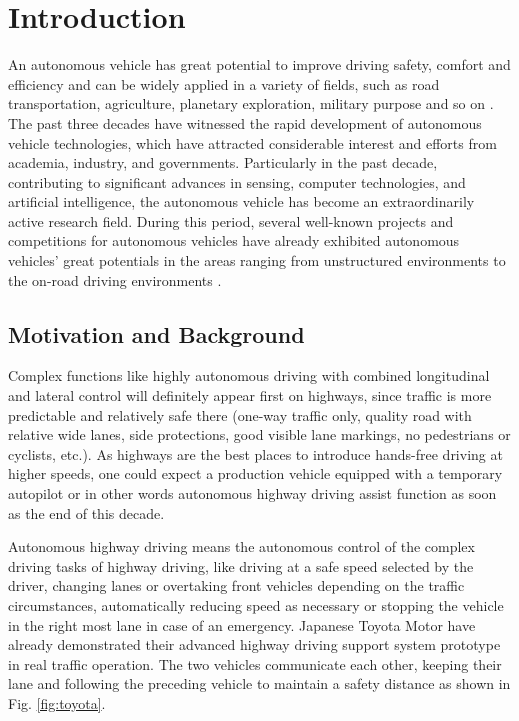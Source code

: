 \chapter{Introduction}


An autonomous vehicle has great potential to improve driving safety, comfort and efficiency and can be widely applied in a variety of fields, such as road transportation, agriculture, planetary exploration, military purpose and so on \cite {WANG2015727}. The past three decades have witnessed the rapid development of autonomous vehicle technologies, which have attracted considerable interest and efforts from academia, industry, and governments. Particularly in the past decade, contributing to significant advances in sensing, computer technologies, and artificial intelligence, the autonomous vehicle has become an extraordinarily active research field. During this period, several well-known projects and competitions for autonomous vehicles have already exhibited autonomous vehicles' great potentials in the areas ranging from unstructured environments to the on-road driving environments \cite{AutonomousStructured} \cite{DrivingUrban2008}.

\section{Motivation and Background}


Complex functions like highly autonomous driving with combined longitudinal and lateral control will definitely appear first on highways, since traffic is more predictable and relatively safe there (one-way traffic only, quality road with relative wide lanes, side protections, good visible lane markings, no pedestrians or cyclists, etc.). As highways are the best places to introduce hands-free driving at higher speeds, one could expect a production vehicle equipped with a temporary autopilot or in other words autonomous highway driving assist function as soon as the end of this decade. 

Autonomous highway driving means the autonomous control of the complex driving tasks of highway driving, like driving at a safe speed selected by the driver, changing lanes or overtaking front vehicles depending on the traffic circumstances, automatically reducing speed as necessary or stopping the vehicle in the right most lane in case of an emergency. Japanese Toyota Motor have already demonstrated their advanced highway driving support system prototype in real traffic operation. The two vehicles  communicate each other, keeping their lane and following the preceding vehicle to maintain a safety distance \cite{Nissan2013} as shown in Fig. \ref{fig:toyota}.

